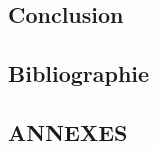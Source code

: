 \documentclass[12pt,a4paper]{report}
\numberwithin{equation}{subsection}
\numberwithin{equation}{section}
\begin{document}
\chapter{}
\section{}

\newpage
\section{Conclusion}
\newpage
\section{Bibliographie}
\newpage
\section{ANNEXES}
\end{document}
